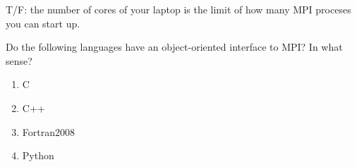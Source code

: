 \begin{review}
  T/F: the number of cores of your laptop is the limit of how many MPI
  proceses you can start up.
\end{review}

\begin{review}
  Do the following languages have an object-oriented interface to MPI? In what sense?
  \begin{enumerate}
  \item C
  \item C++
  \item Fortran2008
  \item Python
  \end{enumerate}
\end{review}
